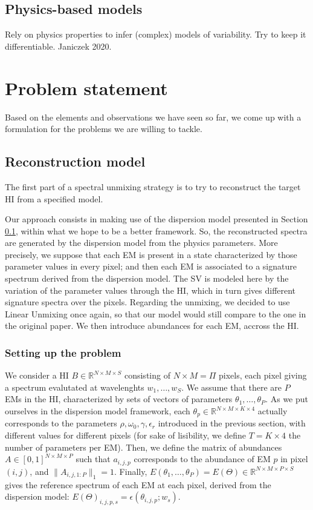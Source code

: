 \documentclass{article}
\begin{document}
\subsection{Physics-based models}\label{sec:dispersion}
Rely on physics properties to infer (complex) models of variability. Try to keep it differentiable. Janiczek 2020.


\section{Problem statement}
Based on the elements and observations we have seen so far, we come up with a formulation for the problems we are willing to tackle.

\subsection{Reconstruction model}
The first part of a spectral unmixing strategy is to try to reconstruct the target HI from a specified model.

Our approach consists in making use of the dispersion model presented in Section \ref{sec:dispersion}, within what we hope to be a better framework. So, the reconstructed spectra are generated by the dispersion model from the physics parameters. More precisely, we suppose that each EM is present in a state characterized by those parameter values in every pixel; and then each EM is associated to a signature spectrum derived from the dispersion model. The SV is modeled here by the variation of the parameter values through the HI, which in turn gives different signature spectra over the pixels. Regarding the unmixing, we decided to use Linear Unmixing once again, so that our model would still compare to the one in the original paper. We then introduce abundances for each EM, accross the HI.

\subsubsection{Setting up the problem}

We consider a HI $B \in \mathbb{R}^{N \times M \times S}$ consisting of $N \times M = \Pi$ pixels, each pixel giving a spectrum evalutated at wavelenghts $w_1,\dots, w_S$. We assume that there are $P$ EMs in the HI, characterized by sets of vectors of parameters $\theta_1,\dots, \theta_P$. As we put ourselves in the dispersion model framework, each $\theta_p \in \mathbb{R}^{N \times M \times K \times 4}$ actually corresponds to the parameters $\rho, \omega_0, \gamma, \epsilon_r$ introduced in the previous section, with different values for different pixels (for sake of lisibility, we define $T = K \times 4$ the number of parameters per EM). Then, we define the matrix of abundances $A \in [0, 1]^{N \times M\times P}$ such that $a_{i, j, p}$ corresponds to the abundance of EM $p$ in pixel $(i, j)$, and $\|A_{i, j, 1:P}\|_1 = 1$. Finally, $E(\theta_1,\dots, \theta_P) = E(\Theta) \in \mathbb{R}^{N \times M \times P \times S}$ gives the reference spectrum of each EM at each pixel, derived from the dispersion model: $E(\Theta)_{i, j, p, s} = \epsilon(\theta_{i, j, p}; w_s)$.
\end{document}
